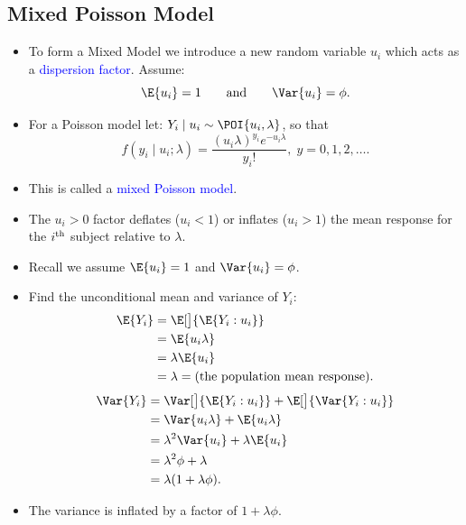\documentclass{article}\usepackage[]{graphicx}\usepackage[svgnames]{xcolor}
\providecommand\given{} %
\renewcommand\given{\nonscript\:\delimsize\vert\nonscript\:\mathopen{}}%
\renewcommand\given{\nonscript\:\delimsize\vert\nonscript\:\mathopen{}}%
\renewcommand\given{\nonscript\:\delimsize\vert\nonscript\:\mathopen{}}%
\renewcommand\given{\nonscript\:\delimsize\vert\nonscript\:\mathopen{}}%
\renewcommand\given{\nonscript\:\delimsize\vert\nonscript\:\mathopen{}}%
\renewcommand\given{\nonscript\:\delimsize\vert\nonscript\:\mathopen{}}%
\renewcommand\given{\nonscript\:\delimsize\vert\nonscript\:\mathopen{}}%
\renewcommand\given{\nonscript\:\delimsize\vert\nonscript\:\mathopen{}}%
\renewcommand\given{\nonscript\:\delimsize\vert\nonscript\:\mathopen{}}%
\renewcommand\given{\nonscript\:\delimsize\vert\nonscript\:\mathopen{}}%
\renewcommand\given{\nonscript\:\delimsize\vert\nonscript\:\mathopen{}}%
\renewcommand\given{:}
\begin{document}
\subsection*{Mixed Poisson Model}
\begin{itemize}
      \item To form a Mixed Model we introduce a new random variable $ u_i $ which acts as a
            \textcolor{Blue}{dispersion factor}. Assume:
            \[ \E{u_i}=1\qquad \text{and}\qquad \Var{u_i}=\phi. \]
      \item For a Poisson model let: $ Y_i\mid u_i \sim \POI{u_i,\lambda} $, so that
            \[ f(y_i\mid u_i;\lambda)=\frac{(u_i\lambda)^{y_i}e^{-u_i\lambda}}{y_i!},\; y=0,1,2,\ldots. \]
      \item This is called a \textcolor{Blue}{mixed Poisson model}.
      \item The $ u_i>0 $ factor deflates ($ u_i<1 $) or inflates ($ u_i>1 $) the mean response for the $ i\textsuperscript{th} $ subject relative to $ \lambda $.
      \item Recall we assume $ \E{u_i}=1 $ and $ \Var{u_i}=\phi $.
      \item Find the unconditional mean and variance of $ Y_i $:
            \begin{align*}
                  \E{Y_i}
                   & =\E[\big]{\E{Y_i\given u_i}}                    \\
                   & =\E{u_i\lambda}                                 \\
                   & =\lambda\E{u_i}                                 \\
                   & =\lambda=\text{(the population mean response)}.
            \end{align*}
            \begin{align*}
                  \Var{Y_i}
                   & =\Var[\big]{\E{Y_i\given u_i}}+\E[\big]{\Var{Y_i\given u_i}} \\
                   & =\Var{u_i\lambda}+\E{u_i\lambda}                             \\
                   & =\lambda^2\Var{u_i}+\lambda\E{u_i}                           \\
                   & =\lambda^2 \phi+\lambda                                      \\
                   & =\lambda(1+\lambda \phi).
            \end{align*}
      \item The variance is inflated by a factor of $ 1+\lambda\phi $.

\end{itemize}
\end{document}
